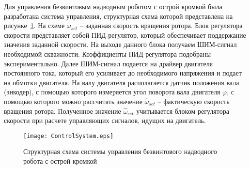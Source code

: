 
Для управления безвинтовым надводным роботом с острой кромкой была разработана система управления, структурная схема которой представлена на рисунке~\ref{ControlSystem}. На схеме $ \omega_{set} $ -- заданная скорость вращения ротора. Блок регулятора скорости представляет собой ПИД-регулятор, который обеспечивает поддержание значения заданной скорости. На выходе данного блока получаем ШИМ-сигнал необходимой скважности. Коэффициенты ПИД-регулятора подобраны экспериментально. Далее ШИМ-сигнал подается на драйвер двигателя постоянного тока, который его усиливает до необходимого напряжения и подает на обмотки двигателя. 
На валу двигателя располагается датчик положения вала (энкодер), с помощью которого измеряется угол поворота вала двигателя $ \varphi $, с помощью которого можно рассчитать значение $ \hat{\omega}_{set} $ -- фактическую скорость вращения ротора. Полученное значение $ \hat{\omega}_{set} $ учитывается блоком регулятора скорости при расчете управляющих сигналов, идущих на двигатель. 

\begin{figure}[!h]
	\centering
	\texttt{[image: ControlSystem.eps]}
	\caption{Структурная схема системы управления безвинтового надводного робота с острой кромкой}
	\label{ControlSystem}
\end{figure}















